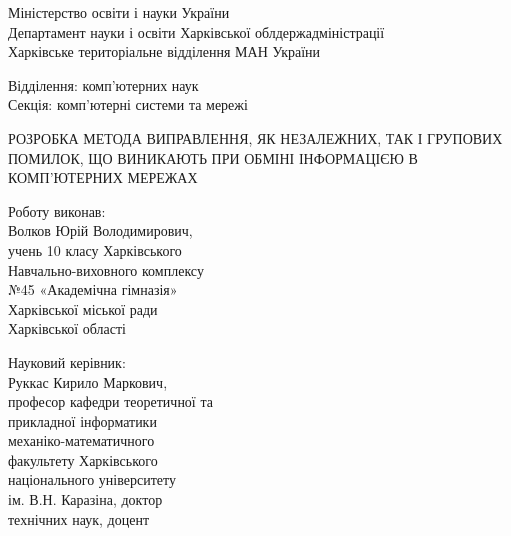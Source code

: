 \documentclass[a4paper, 14pt]{article}
\begin{document}
\thispagestyle{empty} %

\begin{center}
Міністерство освіти і науки України\\ %
Департамент науки і освіти Харківської облдержадміністрації\\
Харківське територіальне відділення МАН України\\
\end{center}

\par\null\par %

\begin{changemargin}{10cm}{0cm}
Відділення: комп'ютерних наук\\
Секція: комп'ютерні системи та мережі
\end{changemargin}

\par\null\par %

\begin{center}
РОЗРОБКА МЕТОДА ВИПРАВЛЕННЯ, ЯК НЕЗАЛЕЖНИХ, ТАК І ГРУПОВИХ
ПОМИЛОК, ЩО ВИНИКАЮТЬ ПРИ ОБМІНІ ІНФОРМАЦІЄЮ В
КОМП'ЮТЕРНИХ МЕРЕЖАХ
\end{center}

\par\null\par\null\par\null %

\begin{changemargin}{10cm}{0cm}
Роботу виконав:\\ 
Волков Юрій Володимирович,\\
учень 10 класу Харківського\\
Навчально-виховного комплексу\\
№45 «Академічна гімназія»\\
Харківської міської ради\\
Харківської області
\end{changemargin}

\par

\begin{changemargin}{10cm}{0cm}
Науковий керівник:\\
Руккас Кирило Маркович,\\
професор кафедри теоретичної та\\
прикладної інформатики\\
механіко-математичного\\
факультету Харківського\\
національного університету\\
ім. В.Н. Каразіна, доктор\\
технічних наук, доцент\\
\vspace*{\fill}
\end{changemargin}
\end{document}
